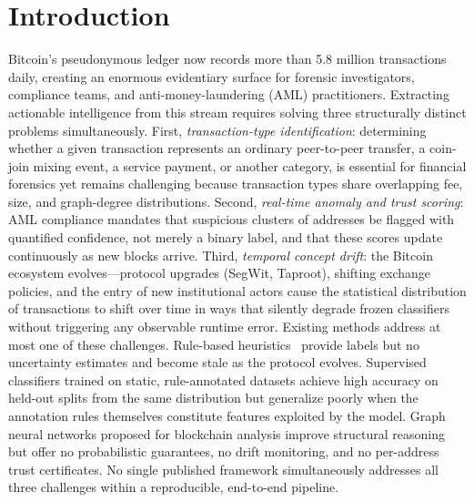 

\section{Introduction}
\label{sec:introduction}

Bitcoin's pseudonymous ledger now records more than \num{5.8} million
transactions daily, creating an enormous evidentiary surface for forensic
investigators, compliance teams, and anti-money-laundering (AML) practitioners.
Extracting actionable intelligence from this stream requires solving three
structurally distinct problems simultaneously.
First, \emph{transaction-type identification}: determining whether a given
transaction represents an ordinary peer-to-peer transfer, a coin-join mixing
event, a service payment, or another category, is essential for financial
forensics yet remains challenging because transaction types share overlapping
fee, size, and graph-degree distributions.
Second, \emph{real-time anomaly and trust scoring}: AML compliance mandates
that suspicious clusters of addresses be flagged with quantified confidence,
not merely a binary label, and that these scores update continuously as new
blocks arrive.
Third, \emph{temporal concept drift}: the Bitcoin ecosystem evolves---protocol
upgrades (SegWit, Taproot), shifting exchange policies, and the entry of new
institutional actors cause the statistical distribution of transactions to
shift over time in ways that silently degrade frozen classifiers without
triggering any observable runtime error.
Existing methods address at most one of these challenges.
Rule-based heuristics~\cite{Harrigan2016} provide labels but no uncertainty
estimates and become stale as the protocol evolves.
Supervised classifiers trained on static, rule-annotated datasets achieve
high accuracy on held-out splits from the same distribution but generalize
poorly when the annotation rules themselves constitute features exploited by
the model.
Graph neural networks proposed for blockchain analysis
\cite{Pareja2020,Weber2019} improve structural reasoning but offer no
probabilistic guarantees, no drift monitoring, and no per-address trust
certificates.
No single published framework simultaneously addresses all three challenges
within a reproducible, end-to-end pipeline.

